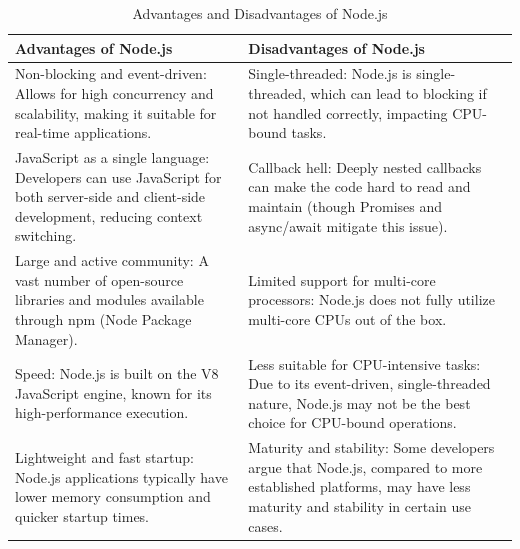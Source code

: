 \begin{table}[H]
    \centering
    \begin{tabularx}{\textwidth}{|X|X|}
        \hline
        \textbf{Advantages of Node.js}                                                                                                               & \textbf{Disadvantages of Node.js}                                                                                                                              \\
        \hline
        Non-blocking and event-driven: Allows for high concurrency and scalability, making it suitable for real-time applications.                   & Single-threaded: Node.js is single-threaded, which can lead to blocking if not handled correctly, impacting CPU-bound tasks.                                   \\
        \hline
        JavaScript as a single language: Developers can use JavaScript for both server-side and client-side development, reducing context switching. & Callback hell: Deeply nested callbacks can make the code hard to read and maintain (though Promises and async/await mitigate this issue).                      \\
        \hline
        Large and active community: A vast number of open-source libraries and modules available through npm (Node Package Manager).                 & Limited support for multi-core processors: Node.js does not fully utilize multi-core CPUs out of the box.                                                      \\
        \hline
        Speed: Node.js is built on the V8 JavaScript engine, known for its high-performance execution.                                               & Less suitable for CPU-intensive tasks: Due to its event-driven, single-threaded nature, Node.js may not be the best choice for CPU-bound operations.           \\
        \hline
        Lightweight and fast startup: Node.js applications typically have lower memory consumption and quicker startup times.                        & Maturity and stability: Some developers argue that Node.js, compared to more established platforms, may have less maturity and stability in certain use cases. \\
        \hline
    \end{tabularx}
    \label{tab:node-js-advantages-disadvantages}
    \caption{Advantages and Disadvantages of Node.js}
\end{table}


